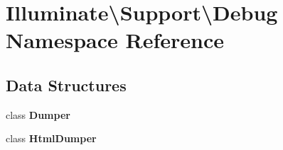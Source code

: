 \section{Illuminate\textbackslash{}Support\textbackslash{}Debug Namespace Reference}
\label{namespace_illuminate_1_1_support_1_1_debug}
\subsection*{Data Structures}
\begin{DoxyCompactItemize}
\item 
class {\bf Dumper}
\item 
class {\bf Html\+Dumper}
\end{DoxyCompactItemize}
